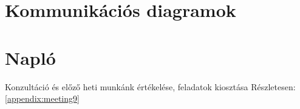 \documentclass[../../projlab]{subfiles}
\begin{document}


\section{Kommunikációs diagramok}


\section{Napló}

\begin{naplo}

	{ 
		Konzultáció és előző heti munkánk értékelése, feladatok kiosztása   
        \newline
		Részletesen: \ref{appendix:meeting9}
	}

    
\end{naplo}

\begin{toappendix}


	
\end{toappendix}
\end{document}
